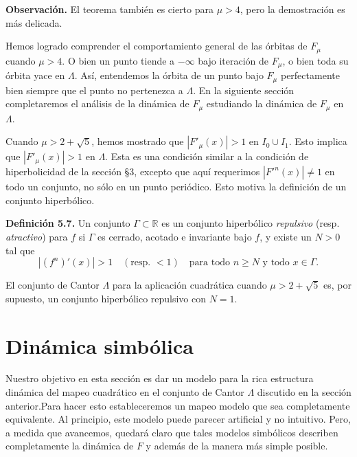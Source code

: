\documentclass[10pt,a4paper]{book}
\begin{document}
\textbf{Observación.} El teorema también es cierto para $\mu > 4$, pero la demostración es más delicada.

\medskip

Hemos logrado comprender el comportamiento general de las órbitas de $F_{\mu}$ cuando $\mu > 4$.  
O bien un punto tiende a $-\infty$ bajo iteración de $F_{\mu}$, o bien toda su órbita yace en $\Lambda$.  
Así, entendemos la órbita de un punto bajo $F_{\mu}$ perfectamente bien siempre que el punto no pertenezca a $\Lambda$.  
En la siguiente sección completaremos el análisis de la dinámica de $F_{\mu}$ estudiando la dinámica de $F_{\mu}$ en $\Lambda$.  

\medskip

Cuando $\mu > 2 + \sqrt{5}$, hemos mostrado que $|F'_{\mu}(x)| > 1$ en $I_{0} \cup I_{1}$.  
Esto implica que $|F'_{\mu}(x)| > 1$ en $\Lambda$.  
Esta es una condición similar a la condición de hiperbolicidad de la sección \S 3,  
excepto que aquí requerimos $|F'^{n}(x)| \neq 1$ en todo un conjunto, no sólo en un punto periódico.  
Esto motiva la definición de un conjunto hiperbólico.  

\medskip

\textbf{Definición 5.7.}  
Un conjunto $\Gamma \subset \mathbb{R}$ es un conjunto hiperbólico \textit{repulsivo} (resp. \textit{atractivo}) para $f$  
si $\Gamma$ es cerrado, acotado e invariante bajo $f$, y existe un $N > 0$ tal que  
\[
|(f^{n})'(x)| > 1 \quad (\text{resp. } < 1) \quad \text{para todo } n \geq N \text{ y todo } x \in \Gamma.
\]

\medskip

El conjunto de Cantor $\Lambda$ para la aplicación cuadrática cuando $\mu > 2 + \sqrt{5}$  
es, por supuesto, un conjunto hiperbólico repulsivo con $N = 1$.

\newpage

\section{Dinámica simbólica}

Nuestro objetivo en esta sección es dar un modelo para la rica estructura dinámica del mapeo cuadrático en el conjunto de Cantor $\Lambda$ discutido en la sección anterior.Para hacer esto estableceremos un mapeo modelo que sea completamente equivalente. Al principio, este modelo puede parecer artificial y no intuitivo. Pero, a medida que avancemos, quedará claro que tales modelos simbólicos describen completamente la dinámica de $F$ y además de la manera más simple posible.
\end{document}
